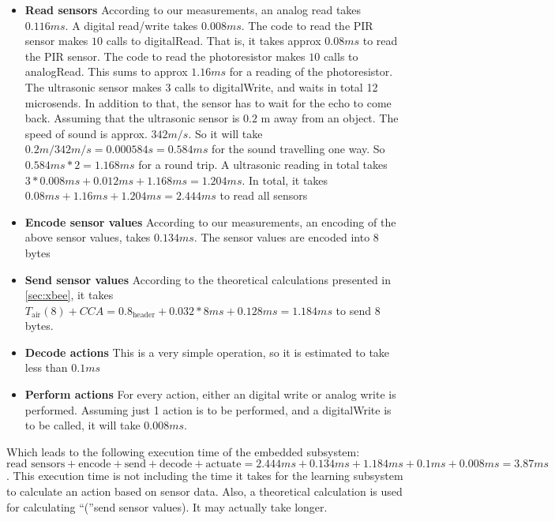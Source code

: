  \begin{itemize}
  \item \textbf{Read sensors} According to our measurements, an analog read takes $0.116 ms$. A digital read/write takes $0.008 ms$. The code to read the PIR sensor makes $10$ calls to digitalRead. That is, it takes approx $0.08 ms$ to read the PIR sensor. The code to read the photoresistor makes $10$ calls to analogRead. This sums to approx $1.16 ms$ for a reading of the photoresistor. The ultrasonic sensor makes 3 calls to digitalWrite, and waits in total 12 microsends. In addition to that, the sensor has to wait for the echo to come back. Assuming that the ultrasonic sensor is $0.2$ m away from an object. The speed of sound is approx. $342 m/s$. So it will take $0.2 m / 342 m/s = 0.000584 s = 0.584 ms$ for the sound travelling one way. So $0.584 ms * 2 = 1.168 ms$ for a round trip. A ultrasonic reading in total takes $3 * 0.008 ms + 0.012 ms + 1.168 ms = 1.204 ms$. In total, it takes $0.08 ms + 1.16 ms + 1.204 ms = 2.444 ms$ to read all sensors
  \item \textbf{Encode sensor values} According to our measurements, an encoding of the above sensor values, takes $0.134 ms$. The sensor values are encoded into 8 bytes
  \item \textbf{Send sensor values} According to the theoretical calculations presented in \cref{sec:xbee}, it takes $T_{\text{air}}(8) + CCA = 0.8_{\text{header}} + 0.032*8 ms + 0.128 ms = 1.184 ms$ to send 8 bytes.
  \item \textbf{Decode actions} This is a very simple operation, so it is estimated to take less than $0.1 ms$
  \item \textbf{Perform actions} For every action, either an digital write or analog write is performed. Assuming just 1 action is to be performed, and a digitalWrite is to be called, it will take $0.008 ms$. 
\end{itemize}

Which leads to the following execution time of the embedded subsystem: $\text{read sensors} + \text{encode} + \text{send} + \text{decode} + \text{actuate} = 2.444 ms + 0.134 ms + 1.184 ms + 0.1 ms + 0.008 ms = 3.87 ms$. This execution time is not including the time it takes for the learning subsystem to calculate an action based on sensor data. Also, a theoretical calculation is used for calculating \enquote(send sensor values). It may actually take longer.
